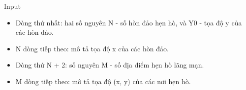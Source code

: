 Input
\begin{itemize}
	\item     Dòng thứ nhất: hai số nguyên N - số hòn đảo hẹn hò, và Y0 - tọa độ y của các hòn đảo.   
	\item     N dòng tiếp theo: mô tả tọa độ x của các hòn đảo.   
	\item     Dòng thứ N + 2: số nguyên M - số địa điểm hẹn hò lãng mạn.   
	\item     M dòng tiếp theo: mô tả tọa độ (x, y) của các nơi hẹn hò.   
\end{itemize}